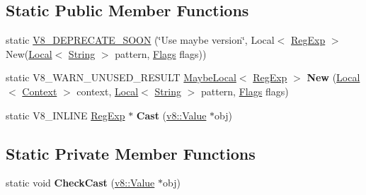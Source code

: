 \subsection*{Static Public Member Functions}
\begin{DoxyCompactItemize}
\item 
static \hyperlink{classv8_1_1_reg_exp_a9793a5a1e31b5ea0563d96d8c74c01ff}{V8\+\_\+\+D\+E\+P\+R\+E\+C\+A\+T\+E\+\_\+\+S\+O\+ON} (\char`\"{}Use maybe version\char`\"{}, Local$<$ \hyperlink{classv8_1_1_reg_exp}{Reg\+Exp} $>$ New(\hyperlink{classv8_1_1_local}{Local}$<$ \hyperlink{classv8_1_1_string}{String} $>$ pattern,                                                                                                                                                                           \hyperlink{classv8_1_1_reg_exp_aa4718a5c1f18472aff3bf51ed694fc5a}{Flags} flags))
\item 
static V8\+\_\+\+W\+A\+R\+N\+\_\+\+U\+N\+U\+S\+E\+D\+\_\+\+R\+E\+S\+U\+LT \hyperlink{classv8_1_1_maybe_local}{Maybe\+Local}$<$ \hyperlink{classv8_1_1_reg_exp}{Reg\+Exp} $>$ {\bfseries New} (\hyperlink{classv8_1_1_local}{Local}$<$ \hyperlink{classv8_1_1_context}{Context} $>$ context, \hyperlink{classv8_1_1_local}{Local}$<$ \hyperlink{classv8_1_1_string}{String} $>$ pattern, \hyperlink{classv8_1_1_reg_exp_aa4718a5c1f18472aff3bf51ed694fc5a}{Flags} flags)\hypertarget{classv8_1_1_reg_exp_a805f632fe98d58160773a4ba1e424b15}{}\label{classv8_1_1_reg_exp_a805f632fe98d58160773a4ba1e424b15}

\item 
static V8\+\_\+\+I\+N\+L\+I\+NE \hyperlink{classv8_1_1_reg_exp}{Reg\+Exp} $\ast$ {\bfseries Cast} (\hyperlink{classv8_1_1_value}{v8\+::\+Value} $\ast$obj)\hypertarget{classv8_1_1_reg_exp_ac06d8f61c0ebb2e7292e6aeff7108f26}{}\label{classv8_1_1_reg_exp_ac06d8f61c0ebb2e7292e6aeff7108f26}

\end{DoxyCompactItemize}
\subsection*{Static Private Member Functions}
\begin{DoxyCompactItemize}
\item 
static void {\bfseries Check\+Cast} (\hyperlink{classv8_1_1_value}{v8\+::\+Value} $\ast$obj)\hypertarget{classv8_1_1_reg_exp_a6d6d2c215db79f12f9d9016b9f725522}{}\label{classv8_1_1_reg_exp_a6d6d2c215db79f12f9d9016b9f725522}

\end{DoxyCompactItemize}


